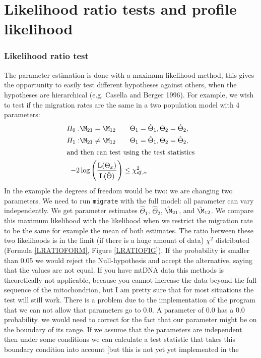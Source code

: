 \chapter{Likelihood ratio tests and profile likelihood}
\subsection{Likelihood ratio test} 
The parameter estimation is done with  a maximum likelihood method, 
this gives the 
opportunity to easily test different hypotheses against others, when the hypotheses are hierarchical (e.g. Casella and Berger 1996). For example,
we wish to test if the migration rates are the same 
in a two population model with 4 parameters: 
\begin{align}
H_0:& \M_{21} = \M_{12}\qquad \Theta_1 = {\hat \Theta_1},\Theta_2 = {\hat \Theta_2},\\
H_1:& \M_{21} \neq \M_{12}\qquad \Theta_1 = {\hat \Theta_1},\Theta_2 = {\hat \Theta_2},\\
\intertext{and then can test using the test statistics}
-2& \log\left(\frac{{\rm L}(\Theta_x)}{{\rm L}(\hat\Theta)}\right) \le \chi^2_{df,\alpha}\label{LRATIOFORM}
\end{align}
In the example the degrees of freedom would be two: we are 
changing two parameters.
We need to run {\tt migrate} with the full model: all parameter can vary
independently. We get parameter estimates ${\hat \Theta_1}$, ${\hat \Theta_2}$,
${\hat \M_{21}}$, and ${\hat \M_{12}}$. We compare this maximum likelihood
with the likelihood when we restrict the migration rate to be the same
for example the mean of both estimates. The ratio between these two likelihoods
is in the limit (if there is a huge amount of data) $\chi^2$ distributed 
(Formula \ref{LRATIOFORM}, Figure \ref{LRATIOFIG}). 
If the probability is smaller than $0.05$ we would reject the 
Null-hypothesis and accept the alternative, saying that the values
are not equal.
If you have mtDNA data this methods is theoretically not applicable, because
you cannot increase the data beyond the full sequence of the mitochondrion,
but I am pretty sure that for most situations the test will 
still work. 
There is a problem due to the implementation of the program that we can
not allow that parameters go to 0.0. A parameter of 0.0 has a 0.0 probability. 
we would need to correct for the fact that our parameter might be on the boundary of its range.
If we assume that the parameters are independent then under some conditions we can calculate 
a test statistic that takes this boundary condition into account [but this is not yet yet implemented in the

